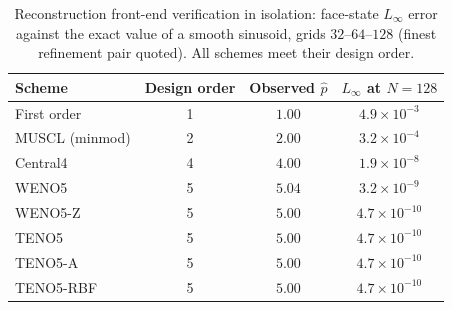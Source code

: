 \documentclass[journal,biblatex]{new-aiaa}
\begin{document}
\begin{table}[H]
\centering\footnotesize\setlength{\tabcolsep}{6pt}
\caption{Reconstruction front-end verification in isolation: face-state $L_\infty$
error against the exact value of a smooth sinusoid, grids $32$--$64$--$128$
(finest refinement pair quoted). All schemes meet their design order.}
\label{tab:recon_order}
\begin{tabular}{@{}lccc@{}}
\toprule
Scheme & Design order & Observed $\hat p$ & $L_\infty$ at $N{=}128$ \\
\midrule
First order & 1 & $1.00$ & $4.9\times10^{-3}$ \\
MUSCL (minmod) & 2 & $2.00$ & $3.2\times10^{-4}$ \\
Central4 & 4 & $4.00$ & $1.9\times10^{-8}$ \\
WENO5 & 5 & $5.04$ & $3.2\times10^{-9}$ \\
WENO5-Z & 5 & $5.00$ & $4.7\times10^{-10}$ \\
TENO5 & 5 & $5.00$ & $4.7\times10^{-10}$ \\
TENO5-A & 5 & $5.00$ & $4.7\times10^{-10}$ \\
TENO5-RBF & 5 & $5.00$ & $4.7\times10^{-10}$ \\
\bottomrule
\end{tabular}
\end{table}
\end{document}
